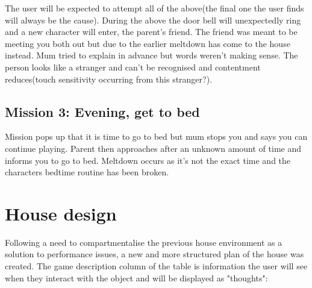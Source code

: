 \documentclass[11pt]{report}
\begin{document}
The user will be expected to attempt all of the above(the final one the user finds will always be the cause). During the above the door bell will unexpectedly ring and a new character will enter, the parent's friend. The friend was meant to be meeting you both out but due to the earlier meltdown has come to the house instead. Mum tried to explain in advance but words weren't making sense. The person looks like a stranger and can't be recognised and contentment reduces(touch sensitivity occurring from this stranger?). 

\subsection*{Mission 3: Evening, get to bed}
Mission pops up that it is time to go to bed but mum stops you and says you can continue playing. Parent then approaches after an unknown amount of time and informs you to go to bed. Meltdown occurs as it's not the exact time and the characters bedtime routine has been broken.

\section{House design}
Following a need to compartmentalise the previous house environment as a solution to performance issues, a new and more structured plan of the house was created. The game description column of the table is information the user will see when they interact with the object and will be displayed as "thoughts":
\end{document}

